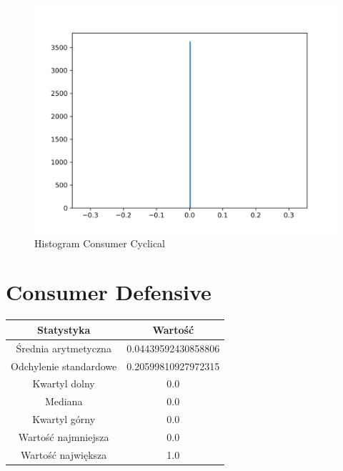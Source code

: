 \documentclass{article}
\begin{document}
\begin{figure}[h!]
    \includegraphics[width=\linewidth]{variables/Consumer Cyclical.png}
    \caption{Histogram Consumer Cyclical }
\end{figure}\section{ Consumer Defensive }

\begin{center}
    \begin{tabular}{|c | c|} 
    \hline
    Statystyka & Wartość \\
    \hline\hline
    Średnia arytmetyczna & 0.04439592430858806 \\ 
    \hline
    Odchylenie standardowe & 0.20599810927972315 \\
    \hline
    Kwartyl dolny & 0.0 \\
    \hline
    Mediana & 0.0 \\
    \hline
    Kwartyl górny & 0.0 \\
    \hline
    Wartość najmniejsza & 0.0 \\
    \hline
    Wartość największa & 1.0 \\
    \hline
   \end{tabular}
\end{center}
\end{document}
